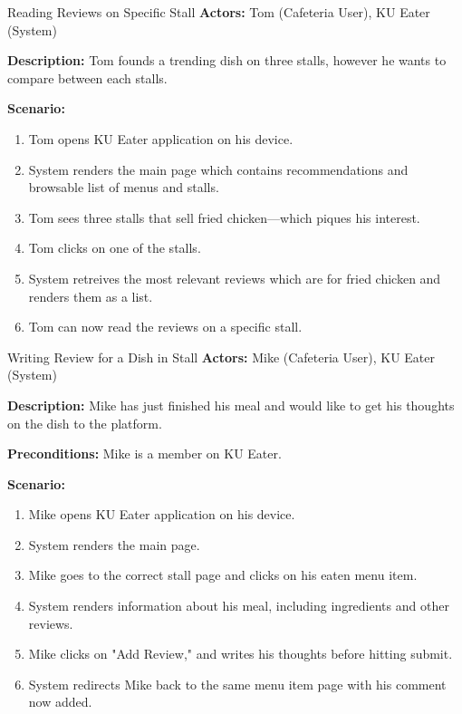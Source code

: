 \begin{usecase}{Reading Reviews on Specific Stall}
    \textbf{Actors:} Tom (Cafeteria User), KU Eater (System)

    \textbf{Description:} Tom founds a trending dish on three stalls, however he wants to compare between each stalls.

    \textbf{Scenario:}

    \begin{enumerate}[leftmargin=80pt]
        \item Tom opens KU Eater application on his device.
        \item System renders the main page which contains recommendations and browsable list of menus and stalls.
        \item Tom sees three stalls that sell fried chicken---which piques his interest.
        \item Tom clicks on one of the stalls.
        \item System retreives the most relevant reviews which are for fried chicken and renders them as a list.
        \item Tom can now read the reviews on a specific stall.
    \end{enumerate}
\end{usecase}

\begin{usecase}{Writing Review for a Dish in Stall}
    \textbf{Actors:} Mike (Cafeteria User), KU Eater (System)

    \textbf{Description:} Mike has just finished his meal and would like to get his thoughts on the dish to the platform.

    \textbf{Preconditions:} Mike is a member on KU Eater.

    \textbf{Scenario:}

    \begin{enumerate}[leftmargin=80pt]
        \item Mike opens KU Eater application on his device.
        \item System renders the main page.
        \item Mike goes to the correct stall page and clicks on his eaten menu item.
        \item System renders information about his meal, including ingredients and other reviews.
        \item Mike clicks on "Add Review," and writes his thoughts before hitting submit.
        \item System redirects Mike back to the same menu item page with his comment now added.
    \end{enumerate}
\end{usecase}

